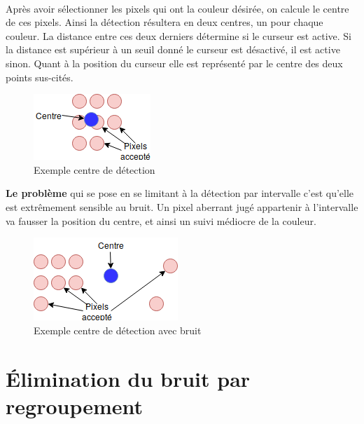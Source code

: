 \documentclass[12pt]{report}
\begin{document}
	\paragraph{}Après avoir sélectionner les pixels qui ont la couleur désirée, on calcule le centre de ces pixels. Ainsi la détection résultera en deux centres, un pour chaque couleur. La distance entre ces deux derniers détermine si le curseur est active. Si la distance est supérieur à un seuil donné le curseur est désactivé, il est active sinon. Quant à la position du curseur elle est représenté par le centre des deux points sus-cités.\\
	\begin{figure}[H]
		\centering
		\includegraphics[scale=0.75]{imgs/centerExample.png}
		\caption{Exemple centre de détection}
		\label{fig:CenterCorrect}
	\end{figure}
	\textbf{Le problème} qui se pose en se limitant à la détection par intervalle c’est qu’elle est extrêmement sensible au bruit. Un pixel aberrant jugé appartenir à l’intervalle va fausser la position du centre, et ainsi un suivi médiocre de la couleur.
	\begin{figure}[H]
		\centering
		\includegraphics[scale=0.75]{imgs/centerExampleE.png}
		\caption{Exemple centre de détection avec bruit}
		\label{fig:CenterWrong}
	\end{figure}
	\section{Élimination du bruit par regroupement}
\end{document}
